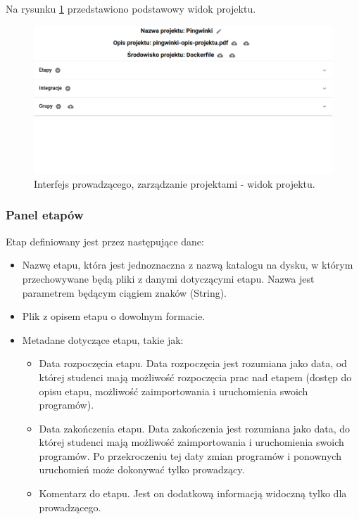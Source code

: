 Na rysunku \ref{fig:lecturer_project_board} przedstawiono podstawowy widok projektu.

\begin{figure}[h]
    \centering
    \includegraphics[width = 15cm]{chapter04/lecturer_project_board.png}
    \caption{Interfejs prowadzącego, zarządzanie projektami - widok projektu.}
    \label{fig:lecturer_project_board}
\end{figure}

\subsubsection{Panel etapów}

Etap definiowany jest przez następujące dane:
\begin {itemize}
    \item Nazwę etapu, która jest jednoznaczna z nazwą katalogu na dysku, w którym przechowywane będą pliki z danymi dotyczącymi etapu.
    Nazwa jest parametrem będącym ciągiem znaków (String).
    \item Plik z opisem etapu o dowolnym formacie.
    \item Metadane dotyczące etapu, takie jak:
    \begin {itemize}
        \item Data rozpoczęcia etapu.
        Data rozpoczęcia jest rozumiana jako data, od której studenci mają możliwość rozpoczęcia prac nad etapem (dostęp do opisu etapu, możliwość zaimportowania i uruchomienia swoich programów).
        \item Data zakończenia etapu.
        Data zakończenia jest rozumiana jako data, do której studenci mają możliwość zaimportowania i uruchomienia swoich programów.
        Po przekroczeniu tej daty zmian programów i ponownych uruchomień może dokonywać tylko prowadzący.
        \item Komentarz do etapu.
        Jest on dodatkową informacją widoczną tylko dla prowadzącego.
    \end{itemize}
\end {itemize}

